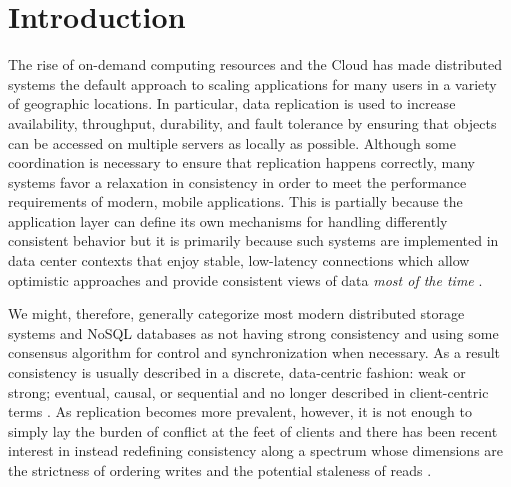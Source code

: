 \documentclass[10pt,conference,letterpaper]{IEEEtran}
\begin{document}
\section{Introduction}


The rise of on-demand computing resources and the Cloud has made distributed systems the
default approach to scaling applications for many users in a variety of geographic
locations.
In particular, data replication is used to increase availability, throughput, durability,
and fault tolerance by ensuring that objects can be accessed on multiple servers as
locally as possible.
Although some coordination is necessary to ensure that replication happens correctly, many
systems favor a relaxation in consistency in order to meet the performance requirements of
modern, mobile applications.
This is partially because the application layer can define its own mechanisms for handling
differently consistent behavior but it is primarily because such systems are implemented
in data center contexts that enjoy stable, low-latency connections which allow optimistic
approaches and provide consistent views of data \emph{most of the time}
\cite{bailis_quantifying_2014,bermbach_metastorage:_2011}.

We might, therefore, generally categorize most modern distributed storage systems and
NoSQL databases as not having strong consistency and using some consensus algorithm for
control and synchronization when necessary.
As a result consistency is usually described in a discrete, data-centric fashion: weak or
strong; eventual, causal, or sequential and no longer described in client-centric terms
\cite{bermbach_consistency_2013}.
As replication becomes more prevalent, however, it is not enough to simply lay the burden
of conflict at the feet of clients and there has been recent interest in instead
redefining consistency along a spectrum whose dimensions are the strictness of ordering
writes and the potential staleness of reads
\cite{yu_design_2002,li_making_2012,afek_quasi-linearizability:_2010,al-ekram_multi-consistency_2010,krishnamurthy_adaptive_2002}.
\end{document}
